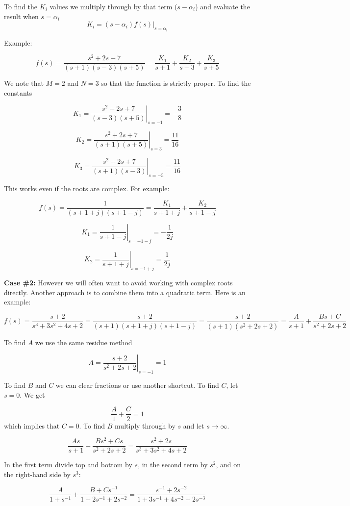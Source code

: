 \documentclass{article}
\begin{document}
To find the $K_i$ values we multiply through by that term ($s-\alpha_i$) and evaluate the result when $s = \alpha_i$
\[
K_i = \left. (s-\alpha_i)f(s) \right|_{s = \alpha_i} 
\]

Example:

\[
f(s) = \frac{s^2 + 2s + 7}{(s+1)(s-3)(s+5)} = \frac{K_1}{s+1} + \frac{K_2}{s-3} + \frac{K_3}{s+5}
\]

We note that $M = 2$ and $N = 3$ so that the function is strictly proper. To find the constants

\[
K_1 = \left. \frac{s^2 + 2s + 7}{(s-3)(s+5)} \right|_{s = -1} = -\frac{3}{8}
\]

\[
K_2 = \left. \frac{s^2 + 2s + 7}{(s+1)(s+5)} \right|_{s = 3} = \frac{11}{16}
\]

\[
K_3 = \left. \frac{s^2 + 2s + 7}{(s+1)(s-3)} \right|_{s = -5} = \frac{11}{16}
\]

This works even if the roots are complex. For example:

\[
f(s) = \frac{1}{(s + 1 + j)(s + 1 -j)} = \frac{K_1}{s + 1 + j} + \frac{K_2}{s + 1 -j}
\]

\[
K_1 = \left. \frac{1}{s + 1 - j} \right|_{s = -1-j} = -\frac{1}{2j}
\]

\[
K_2 = \left. \frac{1}{s + 1 + j} \right|_{s = -1+j} = \frac{1}{2j}
\]

\textbf{Case \#2:} However we will often want to avoid working with complex roots directly. Another approach is to combine them into a quadratic term. Here is an example:

\[
f(s) = \frac{s+2}{s^3 + 3s^2 + 4s + 2} = \frac{s+2}{(s+1)(s+1 +j)(s +1 -j)} = \frac{s+2}{(s+1)(s^2 +2s + 2)} = \frac{A}{s+1} + \frac{Bs + C}{s^2 + 2s + 2}
\]

To find $A$ we use the same residue method

\[
A = \left. \frac{s+2}{s^2 + 2s + 2} \right|_{s = -1} = 1
\]

To find $B$ and $C$ we can clear fractions or use another shortcut. To find $C$, let $s = 0$. We get

\[
\frac{A}{1} + \frac{C}{2} = 1
\]
which implies that $C = 0$. To find $B$ multiply through by $s$ and let $s\rightarrow \infty$.

\[
\frac{As}{s+1} + \frac{Bs^2 + Cs}{s^2 + 2s + 2} = \frac{s^2 + 2s}{s^3 + 3s^2 + 4s + 2}
\]

In the first term divide top and bottom by $s$, in the second term by $s^2$, and on the right-hand side by $s^3$:


\[
\frac{A}{1+s^{-1}} + \frac{B + Cs^{-1}}{1 + 2s^{-1} + 2s^{-2}} = \frac{s^{-1} + 2s^{-2}}{1 + 3s^{-1} + 4s^{-2} + 2s^{-3}}
\]
\end{document}
